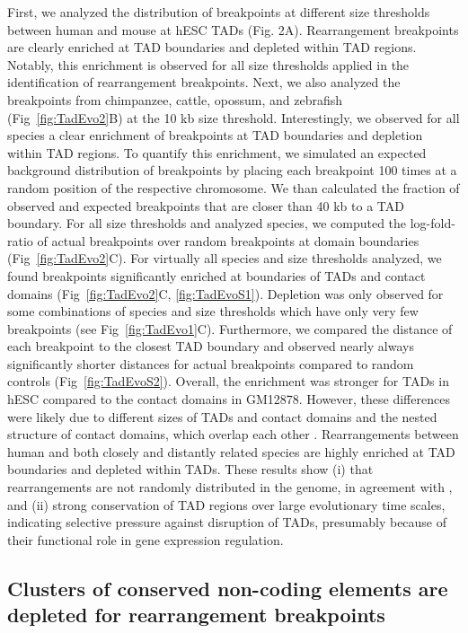 \documentclass[a4paper,twoside=true,openright,parskip=full,chapterprefix=true,11pt,headings=normal,bibliography=totoc,listof=totoc,titlepage=on,captions=tableabove,draft=false]{scrreprt}
\theoremstyle{definition}
\theoremstyle{definition}
\theoremstyle{definition}
\theoremstyle{remark}
\begin{document}
First, we analyzed the distribution of breakpoints at different size
thresholds between human and mouse at hESC TADs (Fig. 2A). Rearrangement
breakpoints are clearly enriched at TAD boundaries and depleted within
TAD regions. Notably, this enrichment is observed for all size
thresholds applied in the identification of rearrangement breakpoints.
Next, we also analyzed the breakpoints from chimpanzee, cattle, opossum,
and zebrafish (Fig~\ref{fig:TadEvo2}B) at the 10 kb size threshold.
Interestingly, we observed for all species a clear enrichment of
breakpoints at TAD boundaries and depletion within TAD regions. To
quantify this enrichment, we simulated an expected background
distribution of breakpoints by placing each breakpoint 100 times at a
random position of the respective chromosome. We than calculated the
fraction of observed and expected breakpoints that are closer than 40 kb
to a TAD boundary. For all size thresholds and analyzed species, we
computed the log-fold-ratio of actual breakpoints over random
breakpoints at domain boundaries (Fig~\ref{fig:TadEvo2}C). For virtually
all species and size thresholds analyzed, we found breakpoints
significantly enriched at boundaries of TADs and contact domains
(Fig~\ref{fig:TadEvo2}C, \ref{fig:TadEvoS1}). Depletion was only
observed for some combinations of species and size thresholds which have
only very few breakpoints (see Fig~\ref{fig:TadEvo1}C). Furthermore, we
compared the distance of each breakpoint to the closest TAD boundary and
observed nearly always significantly shorter distances for actual
breakpoints compared to random controls (Fig~\ref{fig:TadEvoS2}).
Overall, the enrichment was stronger for TADs in hESC compared to the
contact domains in GM12878. However, these differences were likely due
to different sizes of TADs and contact domains and the nested structure
of contact domains, which overlap each other \citep{Rao2014}.
Rearrangements between human and both closely and distantly related
species are highly enriched at TAD boundaries and depleted within TADs.
These results show (i) that rearrangements are not randomly distributed
in the genome, in agreement with \citep{Farre2015}, and (ii) strong
conservation of TAD regions over large evolutionary time scales,
indicating selective pressure against disruption of TADs, presumably
because of their functional role in gene expression regulation.

\subsection{Clusters of conserved non-coding elements are depleted for
rearrangement
breakpoints}\label{clusters-of-conserved-non-coding-elements-are-depleted-for-rearrangement-breakpoints}
\end{document}
